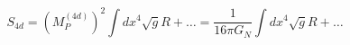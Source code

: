 \begin{equation}
S_{4d} = (M_P^{(4d)})^2 \int dx^4 \sqrt{g} R + \dots =
\frac{1}{16 \pi G_N} \int dx^4 \sqrt{g} R + \dots
\end{equation}

